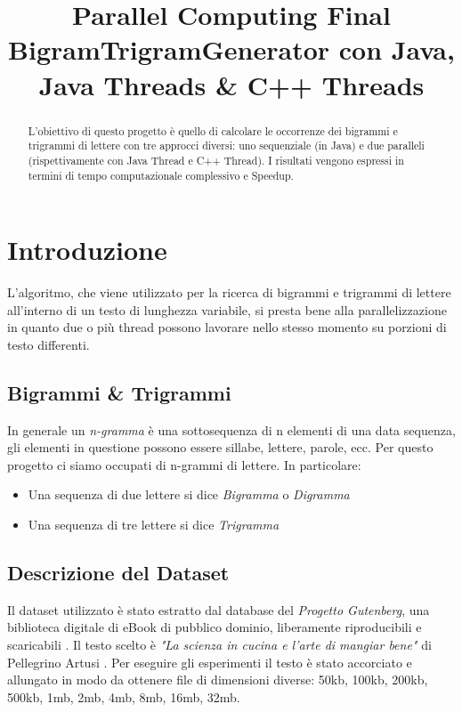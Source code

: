 \documentclass[10pt,twocolumn,letterpaper]{article}
\begin{document}
\title{Parallel Computing Final\\BigramTrigramGenerator con Java, Java Threads \& C++ Threads}

\maketitle
\thispagestyle{empty}

\begin{abstract}
L'obiettivo di questo progetto è quello di calcolare le occorrenze dei bigrammi e trigrammi di lettere con tre approcci diversi: uno sequenziale (in Java) e due paralleli (rispettivamente con Java Thread e C++ Thread). I risultati vengono espressi in termini di tempo computazionale complessivo e Speedup.
\end{abstract}

\section{Introduzione}
L'algoritmo, che viene utilizzato per la ricerca di bigrammi e trigrammi di lettere all'interno di un testo di lunghezza variabile, si presta bene alla parallelizzazione in quanto due o più thread possono lavorare nello stesso momento su porzioni di testo differenti.
   
\subsection{Bigrammi \& Trigrammi}
In generale un \textit{n-gramma} è una sottosequenza di n elementi di una data sequenza, gli elementi in questione possono essere sillabe, lettere, parole, ecc.\cite{N-GRAMMA}\newline
Per questo progetto ci siamo occupati di n-grammi di lettere. In particolare:
\begin{itemize}
	\item Una sequenza di due lettere si dice \textit{Bigramma} o \textit{Digramma}
	\item Una sequenza di tre lettere si dice \textit{Trigramma}
\end{itemize}

\subsection{Descrizione del Dataset}
Il dataset utilizzato è stato estratto dal database del \textit{Progetto Gutenberg}, una biblioteca digitale di eBook di pubblico dominio, liberamente riproducibili e scaricabili \cite{GUTENBERG}. Il testo scelto è \textit{"La scienza in cucina e l'arte di mangiar bene"} di Pellegrino Artusi \cite{ARTUSI}. Per eseguire gli esperimenti il testo è stato accorciato e allungato in modo da ottenere file di dimensioni diverse: 50kb, 100kb, 200kb, 500kb, 1mb, 2mb, 4mb, 8mb, 16mb, 32mb.
\end{document}
